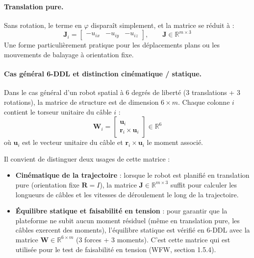 \paragraph{Translation pure.}
Sans rotation, le terme en $\varphi$ disparaît simplement, et la matrice se réduit à :
\begin{equation}
\mathbf{J}_i = \begin{bmatrix} -u_{ix} & -u_{iy} & -u_{iz} \end{bmatrix}, \qquad \mathbf{J} \in \mathbb{R}^{m \times 3}
\end{equation}
Une forme particulièrement pratique pour les déplacements plans ou les mouvements de balayage à orientation fixe.

\paragraph{Cas général 6-DDL et distinction cinématique / statique.}
Dans le cas général d'un robot spatial à 6 degrés de liberté (3 translations + 3 rotations), la matrice de structure est de dimension $6 \times m$. Chaque colonne $i$ contient le torseur unitaire du câble $i$ :
\begin{equation}
\mathbf{W}_i = \begin{bmatrix} \mathbf{u}_i \\ \mathbf{r}_i \times \mathbf{u}_i \end{bmatrix} \in \mathbb{R}^6
\label{eq:Wi}
\end{equation}
où $\mathbf{u}_i$ est le vecteur unitaire du câble et $\mathbf{r}_i \times \mathbf{u}_i$ le moment associé.

Il convient de distinguer deux usages de cette matrice :
\begin{itemize}
\item \textbf{Cinématique de la trajectoire} : lorsque le robot est planifié en translation pure (orientation fixe $\mathbf{R} = I$), la matrice $\mathbf{J} \in \mathbb{R}^{m \times 3}$ suffit pour calculer les longueurs de câbles et les vitesses de déroulement le long de la trajectoire.
\item \textbf{Équilibre statique et faisabilité en tension} : pour garantir que la plateforme ne subit aucun moment résiduel (même en translation pure, les câbles exercent des moments), l'équilibre statique est vérifié en 6-DDL avec la matrice $\mathbf{W} \in \mathbb{R}^{6 \times m}$ (3 forces + 3 moments). C'est cette matrice qui est utilisée pour le test de faisabilité en tension (WFW, section 1.5.4).
\end{itemize}

